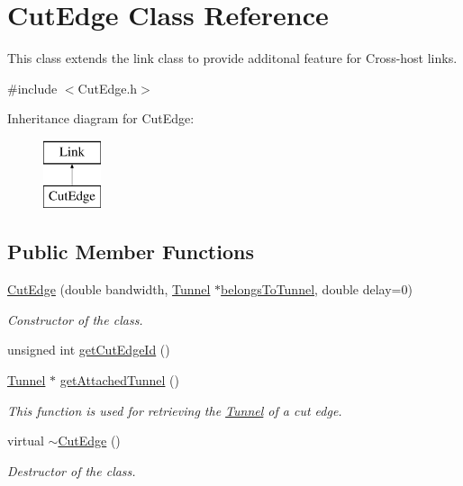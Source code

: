 \hypertarget{classCutEdge}{\section{\-Cut\-Edge \-Class \-Reference}
\label{classCutEdge}
}


\-This class extends the link class to provide additonal feature for \-Cross-\/host links.  




{\ttfamily \#include $<$\-Cut\-Edge.\-h$>$}

\-Inheritance diagram for \-Cut\-Edge\-:\begin{figure}[H]
\begin{center}
\leavevmode
\includegraphics[height=2.000000cm]{classCutEdge}
\end{center}
\end{figure}
\subsection*{\-Public \-Member \-Functions}
\begin{DoxyCompactItemize}
\item 
\hyperlink{classCutEdge_ab24d5839c65303182d92e40f77a444d3}{\-Cut\-Edge} (double bandwidth, \hyperlink{classTunnel}{\-Tunnel} $\ast$\hyperlink{classCutEdge_a2c712271a4b9c321e5408faeaf934153}{belongs\-To\-Tunnel}, double delay=0)
\begin{DoxyCompactList}\small\item\em \-Constructor of the class. \end{DoxyCompactList}\item 
unsigned int \hyperlink{classCutEdge_aec72fb17846b7b07224958ad7f7ca5a9}{get\-Cut\-Edge\-Id} ()
\item 
\hyperlink{classTunnel}{\-Tunnel} $\ast$ \hyperlink{classCutEdge_a2a5be5b7c4d156dc583dad29aa6c1336}{get\-Attached\-Tunnel} ()
\begin{DoxyCompactList}\small\item\em \-This function is used for retrieving the \hyperlink{classTunnel}{\-Tunnel} of a cut edge. \end{DoxyCompactList}\item 
\hypertarget{classCutEdge_a7ef8bcdd46b775faa4644b23e821aaec}{virtual \hyperlink{classCutEdge_a7ef8bcdd46b775faa4644b23e821aaec}{$\sim$\-Cut\-Edge} ()}\label{classCutEdge_a7ef8bcdd46b775faa4644b23e821aaec}

\begin{DoxyCompactList}\small\item\em \-Destructor of the class. \end{DoxyCompactList}\end{DoxyCompactItemize}
